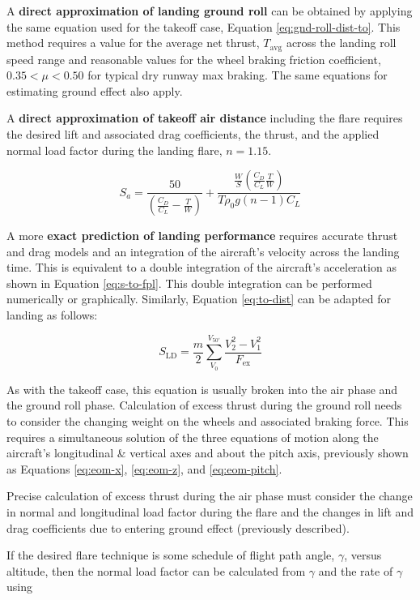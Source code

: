 \documentclass[
]{book}
\begin{document}
A \textbf{direct approximation of landing ground roll} can be obtained by applying the
same equation used for the takeoff case, Equation \eqref{eq:gnd-roll-dist-to}. This method requires a value for
the average net thrust, \(T_{\text{avg}}\) across the landing roll speed range and
reasonable values for the wheel braking friction coefficient,
\(0.35 \lt \mu \lt 0.50\) for typical dry runway max braking. The same equations
for estimating ground effect also apply.

A \textbf{direct approximation of takeoff air distance} including the flare requires
the desired lift and associated drag coefficients, the thrust, and the applied
normal load factor during the landing flare, \(n = 1.15\).

\[
S_a = \frac{50}{\left( \frac{C_D}{C_L} - \frac{T}{W} \right)} + \frac{ \frac{W}{S} \left( \frac{C_D}{C_L} \frac{T}{W} \right) }{T \rho_0  g \left( n - 1 \right) C_L }
\label{eq:approx-air-dist-land}
\]

A more \textbf{exact prediction of landing performance} requires accurate thrust and
drag models and an integration of the aircraft's velocity across the landing
time. This is equivalent to a double integration of the aircraft's acceleration
as shown in Equation \eqref{eq:s-to-fpl}. This double integration can be performed
numerically or graphically. Similarly, Equation \eqref{eq:to-dist} can be adapted
for landing as follows:

\[
S_{\mathrm{LD}} = \frac{m}{2} \sum_{V_0}^{V_{50'}} \frac{V^2_2 - V^2_1}{F_{\text{ex}}}
\label{eq:land-dist}
\]

As with the takeoff case, this equation is usually broken into the air phase and
the ground roll phase. Calculation of excess thrust during the ground roll needs
to consider the changing weight on the wheels and associated braking force. This
requires a simultaneous solution of the three equations of motion along the
aircraft's longitudinal \& vertical axes and about the pitch axis, previously
shown as Equations \eqref{eq:eom-x}, \eqref{eq:eom-z}, and \eqref{eq:eom-pitch}.

Precise calculation of excess thrust during the air phase must consider the
change in normal and longitudinal load factor during the flare and the changes
in lift and drag coefficients due to entering ground effect (previously
described).

If the desired flare technique is some schedule of flight path angle,
\(\gamma\), versus altitude, then the normal load factor can be calculated from
\(\gamma\) and the rate of \(\gamma\) using
\end{document}
